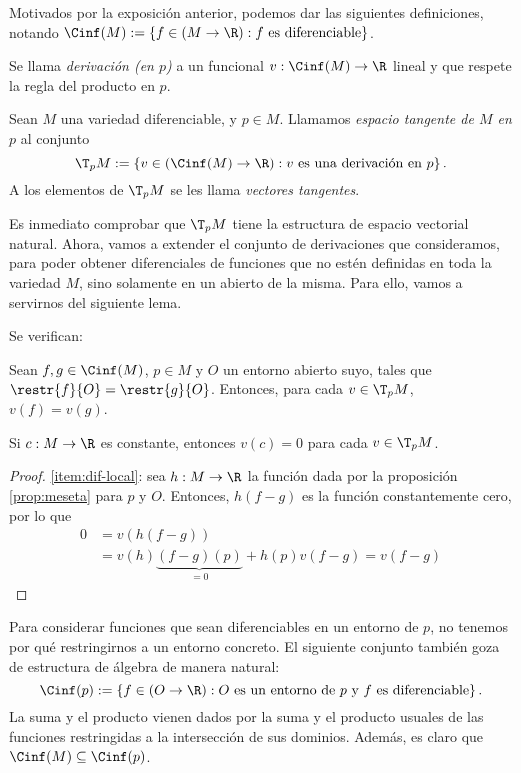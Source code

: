 Motivados por la exposición anterior, podemos dar las siguientes definiciones,
notando $\Cinf(M) := \left\{ f\in(M\to\R) : f\text{ es diferenciable} \right\}$.

\begin{ndef}[Derivación]
  Se llama \emph{derivación (en $p$)} a un funcional $v: \Cinf(M)\to\R$ lineal y que
  respete la regla del producto en $p$.
\end{ndef}

\begin{ndef}
  Sean $M$ una variedad diferenciable, y $p\in M$. Llamamos \emph{espacio
tangente de $M$ en $p$} al conjunto
  \[
    \T_{p}M := \left\{ v\in(\Cinf(M)\to\R) :
        v\text{ es una derivación en $p$}
\right\}
  .\]
A los elementos de $\T_{p}M$ se les llama \emph{vectores tangentes}.
\end{ndef}

Es inmediato comprobar que $\T_{p}M$ tiene la estructura de espacio vectorial
natural. Ahora, vamos a extender el conjunto de derivaciones que consideramos,
para poder obtener diferenciales de funciones que no estén definidas en toda la
variedad $M$, sino solamente en un abierto de la misma. Para ello, vamos a
servirnos del siguiente lema.
\begin{lema} \label{lema:derivacion-local}
  Se verifican:
  \begin{nlist}
  \item \label{item:dif-local}
    Sean $f,g\in\Cinf(M)$, $p\in M$ y $O$ un entorno abierto suyo, tales que
    $\restr{f}{O} = \restr{g}{O}$. Entonces, para cada $v\in \T_{p}M$, $v(f)=v(g)$.
  \item
    Si $c:M\to\R$ es constante, entonces $v(c) = 0$ para cada $v\in \T_{p}M$.
  \end{nlist}
\end{lema}
\begin{proof}
  \ref{item:dif-local}: sea $h: M\to\R$ la función dada por la proposición
  \ref{prop:meseta} para $p$ y $O$. Entonces, $h(f-g)$ es la función
  constantemente cero, por lo que
  \begin{align*}
    0 &= v(h(f-g)) \\
    & = v(h)\underbrace{(f-g)(p)}_{=0} + h(p)v(f-g) = v(f-g) 
  \end{align*}
\end{proof}

Para considerar funciones que sean diferenciables en un entorno de $p$, no
tenemos por qué restringirnos a un entorno concreto. El siguiente conjunto
también goza de estructura de álgebra de manera natural:
\[
  \Cinf(p) := \left\{ f\in(O\to\R) : O\text{ es un entorno de $p$ y } f\text{ es diferenciable} \right\}
.\]
La suma y el producto vienen dados por la suma y el producto usuales de las
funciones restringidas a la intersección de sus dominios. Además, es claro que
$\Cinf(M)\subseteq\Cinf(p)$.

